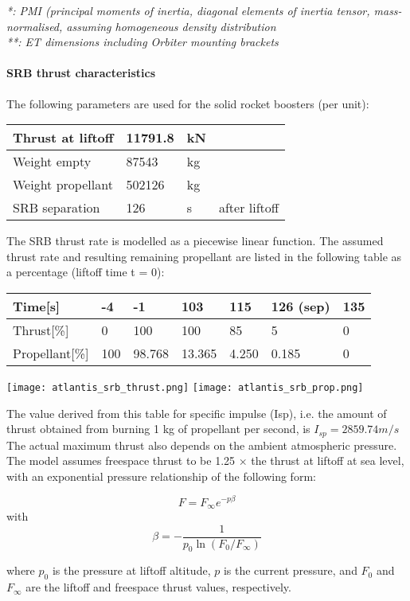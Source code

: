 \documentclass[Orbiter User Manual.tex]{subfiles}
\begin{document}
\noindent
\textit{*:	PMI (principal moments of inertia, diagonal elements of inertia tensor, mass-normalised, assuming homogeneous density distribution}\\
\textit{**:	ET dimensions including Orbiter mounting brackets}

\paragraph{SRB thrust characteristics}
The following parameters are used for the solid rocket boosters (per unit):

\begin{table}[H]
\centering
\begin{tabular}{|l|l|l|l|}
\hline
Thrust at liftoff & 11791.8 & kN & \\
\hline
Weight empty & 87543 & kg & \\
\hline
Weight propellant & 502126 & kg & \\
\hline
SRB separation & 126 & s & after liftoff\\
\hline
\end{tabular}
\end{table}

The SRB thrust rate is modelled as a piecewise linear function. The assumed thrust rate and resulting remaining propellant are listed in the following table as a percentage (liftoff time t = 0):

\begin{table}[H]
\centering
\begin{tabular}{|l|l|l|l|l|l|l|}
\hline
Time[s] 	 			& -4  & -1     & 103    & 115   & 126 (sep) & 135 \\
\hline
Thrust[\%] 			& 0   & 100    & 100    & 85    & 5         & 0   \\
\hline
Propellant[\%]  & 100 & 98.768 & 13.365 & 4.250 & 0.185     & 0   \\
\hline
\end{tabular}
\end{table}

\texttt{[image: atlantis\_srb\_thrust.png]}
\texttt{[image: atlantis\_srb\_prop.png]}

The value derived from this table for specific impulse (Isp), i.e. the amount of thrust obtained from burning 1 kg of propellant per second, is
$I_{sp} = 2859.74 m/s$
The actual maximum thrust also depends on the ambient atmospheric pressure. The model assumes freespace thrust to be 1.25 × the thrust at liftoff at sea level, with an exponential pressure relationship of the following form:
\begin{center}
\[F = F_\infty e^{-p\beta}\] with \[\beta = -\frac{1}{p_0\ln{(F_0/F_\infty)}}\]
\end{center}
where $p_0$ is the pressure at liftoff altitude, $p$ is the current pressure, and $F_0$ and $F_\infty$ are the liftoff and freespace thrust values, respectively.
\end{document}
